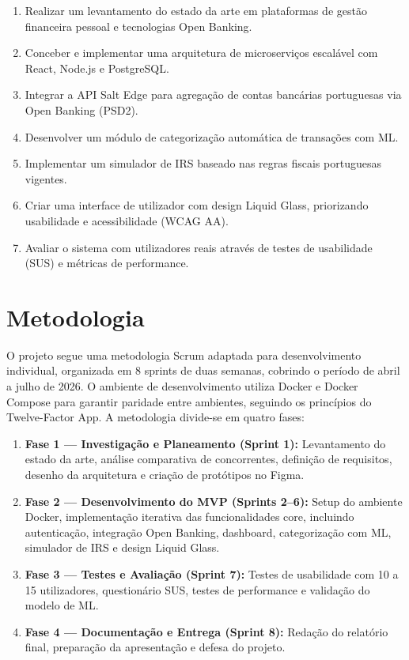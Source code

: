 \begin{enumerate}[label=\textbf{OE\arabic*}]
    \item Realizar um levantamento do estado da arte em plataformas de gestão financeira pessoal e tecnologias Open Banking.
    \item Conceber e implementar uma arquitetura de microserviços escalável com React, Node.js e PostgreSQL.
    \item Integrar a \ac{API} Salt Edge para agregação de contas bancárias portuguesas via Open Banking (\ac{PSD2}).
    \item Desenvolver um módulo de categorização automática de transações com \ac{ML}.
    \item Implementar um simulador de \ac{IRS} baseado nas regras fiscais portuguesas vigentes.
    \item Criar uma interface de utilizador com design Liquid Glass, priorizando usabilidade e acessibilidade (\ac{WCAG} AA).
    \item Avaliar o sistema com utilizadores reais através de testes de usabilidade (\ac{SUS}) e métricas de performance.
\end{enumerate}


\section{Metodologia}
\label{sec:metodologia}

O projeto segue uma metodologia Scrum adaptada para desenvolvimento individual, organizada em 8 sprints de duas semanas, cobrindo o período de abril a julho de 2026. O ambiente de desenvolvimento utiliza Docker e Docker Compose para garantir paridade entre ambientes, seguindo os princípios do Twelve-Factor App. A metodologia divide-se em quatro fases:

\begin{enumerate}
    \item \textbf{Fase 1 --- Investigação e Planeamento (Sprint 1):} Levantamento do estado da arte, análise comparativa de concorrentes, definição de requisitos, desenho da arquitetura e criação de protótipos no Figma.
    \item \textbf{Fase 2 --- Desenvolvimento do \ac{MVP} (Sprints 2--6):} Setup do ambiente Docker, implementação iterativa das funcionalidades core, incluindo autenticação, integração Open Banking, dashboard, categorização com \ac{ML}, simulador de \ac{IRS} e design Liquid Glass.
    \item \textbf{Fase 3 --- Testes e Avaliação (Sprint 7):} Testes de usabilidade com 10 a 15 utilizadores, questionário \ac{SUS}, testes de performance e validação do modelo de \ac{ML}.
    \item \textbf{Fase 4 --- Documentação e Entrega (Sprint 8):} Redação do relatório final, preparação da apresentação e defesa do projeto.
\end{enumerate}


